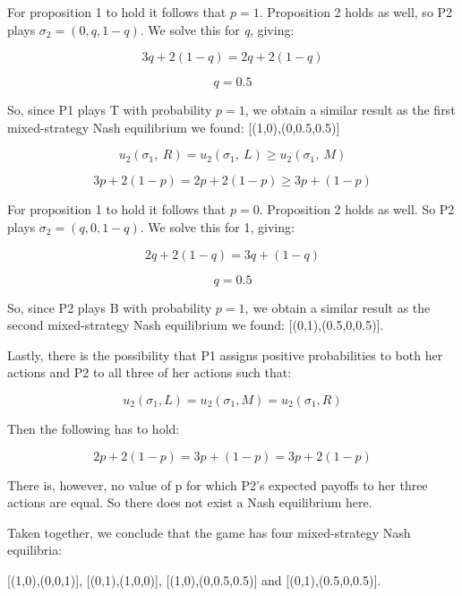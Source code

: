 \documentclass[a4paper]{article}
\begin{document}
For proposition 1 to hold it follows that \(p = 1\). Proposition 2 holds
as well, so P2 plays \(\sigma_{2} = (0,q,1 - q)\). We solve this for
\emph{q}, giving:

\[3q + 2\left( 1 - q \right) = 2q + 2\left( 1 - q \right)\]

\[q = 0.5\]

So, since P1 plays T with probability \(p = 1\), we obtain a similar
result as the first mixed-strategy Nash equilibrium we found:
{[}(1,0),(0,0.5,0.5){]}

\[u_{2}\left( \sigma_{1},\ R \right) = u_{2}\left( \sigma_{1},\ L \right) \geq u_{2}(\sigma_{1},\ M)\]

\[3p + 2\left( 1 - p \right) = 2p + 2\left( 1 - p \right) \geq 3p + (1 - p)\]

For proposition 1 to hold it follows that \(p = 0\). Proposition 2 holds
as well. So P2 plays \(\sigma_{2} = (q,0,1 - q)\). We solve this for 1,
giving:

\[2q + 2\left( 1 - q \right) = 3q + \left( 1 - q \right)\]

\[q = 0.5\]

So, since P2 plays B with probability \(p = 1,\ \)we obtain a similar
result as the second mixed-strategy Nash equilibrium we found:
{[}(0,1),(0.5,0,0.5){]}.

Lastly, there is the possibility that P1 assigns positive probabilities
to both her actions and P2 to all three of her actions such that:

\[u_{2}\left( \sigma_{1},L \right) = u_{2}\left( \sigma_{1},M \right) = u_{2}(\sigma_{1},R)\]

Then the following has to hold:

\[2p + 2\left( 1 - p \right) = 3p + \left( 1 - p \right) = 3p + 2(1 - p)\]

There is, however, no value of \(\text{p\ }\)for which P2's expected
payoffs to her three actions are equal. So there does not exist a Nash
equilibrium here.

Taken together, we conclude that the game has four mixed-strategy Nash
equilibria:

{[}(1,0),(0,0,1){]}, {[}(0,1),(1,0,0){]}, {[}(1,0),(0,0.5,0.5){]} and
{[}(0,1),(0.5,0,0.5){]}.
\end{document}
